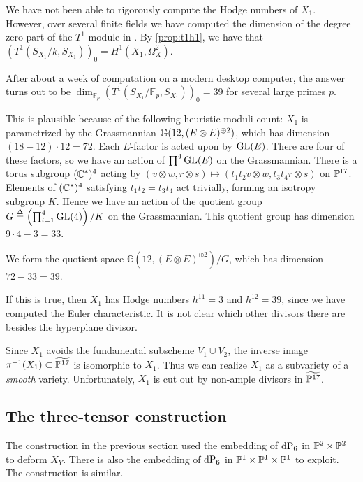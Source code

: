 \begin{remark}
We have not been able to rigorously compute the Hodge numbers of $X_1$. However, over several finite fields we have computed the dimension of the degree zero part of the $T^1$-module in \MM. By \cref{prop:t1h1}, we have that $(T^1(S_{X_1}/k,S_{X_1}))_0 = H^1(X_1,\Omega^2_X)$.

After about a week of computation on a modern desktop computer, the answer turns out to be $\dim_{\mathbb F_p} (T^1(S_{X_1}/\mathbb F_p,S_{X_1}))_0 = 39$ for several large primes $p$.

This is plausible because of the following heuristic moduli count: $X_1$ is parametrized by the Grassmannian $\Gr(12,(E \otimes E)^{\oplus 2} )$, which has dimension $(18-12)\cdot 12 = 72$. Each $E$-factor is acted upon by $\GL(E)$. There are four of these factors, so we have an action of $\prod^4 \GL(E)$ on the Grassmannian. There is a torus subgroup $(\C^\ast)^4$ acting by $(v \otimes w, r \otimes s) \mapsto (t_1t_2 v \otimes w, t_3t_4 r \otimes s)$ on $\P^{17}$. Elements of $(\C^\ast)^4$ satisfying $t_1t_2=t_3t_4$ act trivially, forming an isotropy subgroup $K$.  Hence we have an action of the quotient group $G \stackrel \Delta = \left(\prod_{i=1}^4 \GL(4)\right)/K$ on the Grassmannian. This quotient group has dimension $9 \cdot 4 - 3 = 33$.

We form the quotient space $\mathbb G(12,(E \otimes E)^{\oplus 2})/G$, which has dimension $72-33=39$.

If this is true, then $X_1$ has Hodge numbers $h^{11}=3$ and $h^{12}=39$, since we have computed the Euler characteristic. It is not clear which other divisors there are besides the hyperplane divisor.
\end{remark}

\begin{remark}
Since $X_1$ avoids the fundamental subscheme $V_1 \cup V_2$, the inverse image $\pi^{-1}(X_1) \subset \widetilde{\P^{17}}$ is isomorphic to $X_1$. Thus we can realize $X_1$ as a subvariety of a \emph{smooth} variety. Unfortunately, $X_1$ is cut out by non-ample divisors in $\widetilde{\P^{17}}$.
\end{remark}

\subsection{The three-tensor construction}

The construction in the previous section used the embedding of $\dP6$ in $\P^2 \times \P^2$ to deform $X_Y$. There is also the embedding of $\dP6$ in $\P^1 \times \P^1 \times \P^1$ to exploit. The construction is similar.

